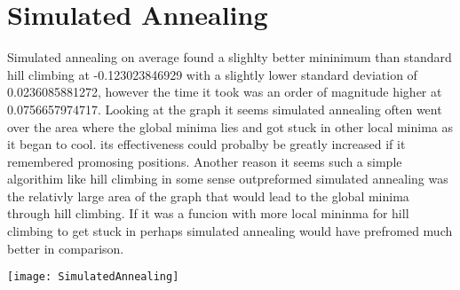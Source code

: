 \documentclass[12pt]{article}
\begin{document}
\section{Simulated Annealing}
Simulated annealing on average found a slighlty better mininimum than standard hill climbing at -0.123023846929 with a slightly lower standard deviation of 0.0236085881272, however the time it took was an order of magnitude higher at 0.0756657974717. Looking at the graph it seems simulated annealing often went over the area where the global minima lies and got stuck in other local minima as it began to cool. its effectiveness could probalby be greatly increased if it remembered promosing positions. Another reason it seems such a simple algorithim like hill climbing in some sense outpreformed simulated annealing was the relativly large area of the graph that would lead to the global minima through hill climbing. If it was a funcion with more local mininma for hill climbing to get stuck in perhaps simulated annealing would have prefromed much better in comparison. 

\texttt{[image: SimulatedAnnealing]}
\end{document}
